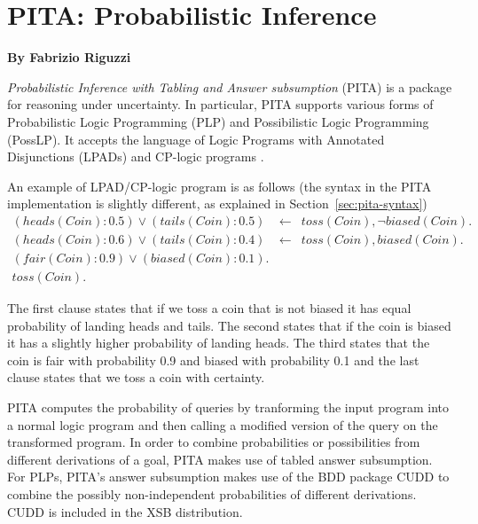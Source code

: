 \chapter{ PITA: Probabilistic  Inference}
\label{package:pita} 

  \begin{center}
    {\Large {\bf By Fabrizio Riguzzi}}
  \end{center}


%



{\em Probabilistic Inference with Tabling and Answer subsumption}
(PITA) \cite{RigS13,RigS11a} is a package for reasoning under
uncertainty. In particular, PITA supports various forms of
Probabilistic Logic Programming (PLP) and Possibilistic Logic
Programming (PossLP). It accepts the language of Logic Programs with
Annotated Disjunctions (LPADs)\cite{VenVer03-TR,VenVer04-ICLP04-IC}
and CP-logic programs
\cite{VenDenBru-JELIA06,DBLP:journals/tplp/VennekensDB09}.

An example of LPAD/CP-logic program is as follows (the syntax in the
PITA implementation is slightly different, as explained in
Section~\ref{sec:pita-syntax})
\begin{eqnarray*}
(heads(Coin):0.5)\vee (tails(Coin):0.5)&\leftarrow&
toss(Coin),\neg biased(Coin).\\
(heads(Coin):0.6)\vee (tails(Coin):0.4)&\leftarrow&
toss(Coin), biased(Coin).\\
(fair(Coin):0.9) \vee (biased(Coin):0.1).&&\\
toss(Coin).&&
\end{eqnarray*}

The first clause states that if we toss a coin that is not biased it
has equal probability of landing heads and tails. The second states
that if the coin is biased it has a slightly higher probability of
landing heads. The third states that the coin is fair with probability
0.9 and biased with probability 0.1 and the last clause states that we
toss a coin with certainty.

PITA computes the probability of queries by tranforming the input
program into a normal logic program and then calling a modified
version of the query on the transformed program.  In order to combine
probabilities or possibilities from different derivations of a goal,
PITA makes use of tabled answer subsumption.  For PLPs, PITA's answer
subsumption makes use of the BDD package CUDD to combine the possibly
non-independent probabilities of different derivations.  CUDD is
included in the XSB distribution.

